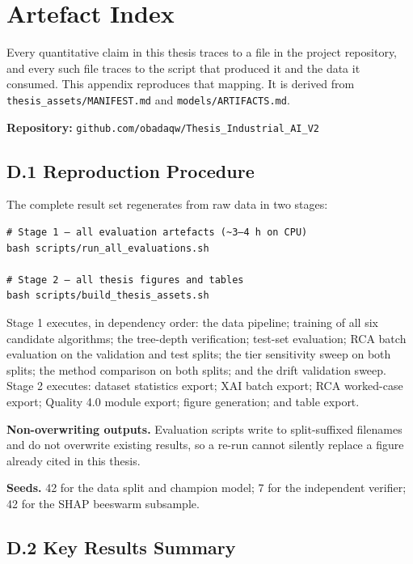 \hypertarget{artefact-index}{%
\chapter{Artefact Index}\label{artefact-index}}

Every quantitative claim in this thesis traces to a file in the project repository, and every such file traces to the script that produced it and the data it consumed. This appendix reproduces that mapping. It is derived from \texttt{thesis\_assets/MANIFEST.md} and \texttt{models/ARTIFACTS.md}.

\textbf{Repository:} \texttt{github.com/obadaqw/Thesis\_Industrial\_AI\_V2}

\hypertarget{d.1-reproduction-procedure}{%
\section{D.1 Reproduction Procedure}\label{d.1-reproduction-procedure}}

The complete result set regenerates from raw data in two stages:

\begin{verbatim}
# Stage 1 — all evaluation artefacts (~3–4 h on CPU)
bash scripts/run_all_evaluations.sh

# Stage 2 — all thesis figures and tables
bash scripts/build_thesis_assets.sh
\end{verbatim}

Stage 1 executes, in dependency order: the data pipeline; training of all six candidate algorithms; the tree-depth verification; test-set evaluation; RCA batch evaluation on the validation and test splits; the tier sensitivity sweep on both splits; the method comparison on both splits; and the drift validation sweep. Stage 2 executes: dataset statistics export; XAI batch export; RCA worked-case export; Quality 4.0 module export; figure generation; and table export.

\textbf{Non-overwriting outputs.} Evaluation scripts write to split-suffixed filenames and do not overwrite existing results, so a re-run cannot silently replace a figure already cited in this thesis.

\textbf{Seeds.} 42 for the data split and champion model; 7 for the independent verifier; 42 for the SHAP beeswarm subsample.

\hypertarget{d.2-key-results-summary}{%
\section{D.2 Key Results Summary}\label{d.2-key-results-summary}}

